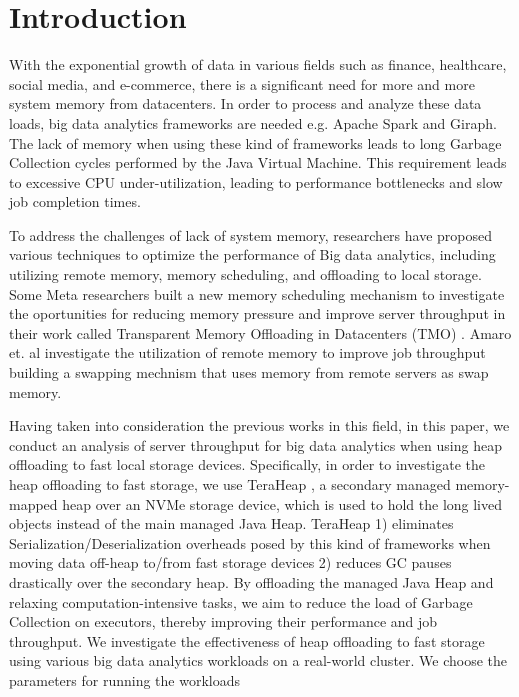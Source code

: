 \section{Introduction}
\label{sec:intro}

With the exponential growth of data in various fields such as finance,
healthcare, social media, and e-commerce, there is a significant need
for more and more system memory from datacenters. In order
to process and analyze these data loads, big data analytics frameworks
are needed e.g. Apache Spark \cite{Spark} and Giraph. 
The lack of memory when using these kind of frameworks leads to
long Garbage Collection cycles performed by the Java Virtual Machine.
This requirement leads to excessive CPU under-utilization, 
leading to performance bottlenecks and slow job completion
times.
\par To address the challenges of lack of system memory, researchers have proposed various
techniques to optimize the performance of Big data analytics, including
utilizing remote memory, memory scheduling, and offloading to local storage.
Some Meta researchers built a new memory scheduling mechanism to investigate the oportunities
for reducing memory pressure and improve server throughput in their work called Transparent Memory Offloading in Datacenters (TMO)
\cite{TMO}. Amaro et. al investigate the utilization of remote memory to improve job throughput \cite{CFM} building a swapping mechnism that uses memory from remote servers as swap memory.
\par Having taken into consideration the previous works in this field,
in this paper, we conduct an analysis of server throughput for big data analytics when using heap offloading to fast local storage devices.
Specifically, in order to investigate the heap offloading to fast storage,
we use TeraHeap \cite{TeraHeap}, a secondary managed
memory-mapped heap over an NVMe storage device, which is used to hold
the long lived objects instead of the main
managed Java Heap.
TeraHeap 1) eliminates Serialization/Deserialization overheads posed
by this kind of frameworks when moving data off-heap to/from fast
storage devices 2) reduces GC pauses drastically over the secondary heap.
By offloading the managed Java Heap and relaxing computation-intensive tasks, we aim
to reduce the load of Garbage Collection on executors, thereby improving their
performance and job throughput.
We investigate the effectiveness of heap offloading to fast storage using various big
data analytics workloads on a real-world cluster. We choose the parameters for running the workloads
